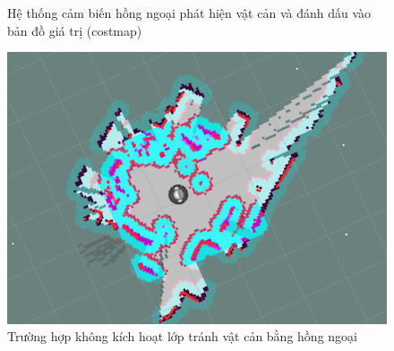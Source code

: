 \begin{figure}[htbp]
    \centering
    \hspace{8pt}
    \caption{Hệ thống cảm biến hồng ngoại phát hiện vật cản và đánh dấu vào bản đồ giá trị (costmap)}
    \label{fig:rb_withIR_ObstacleDetected}
\end{figure}

\begin{figure}[htbp]
    \centering
    \includegraphics[width=0.75\linewidth]{figures/RB_withoutIR_obstacleDetect.png}
    \caption{Trường hợp không kích hoạt lớp tránh vật cản bằng hồng ngoại}
    \label{fig:rb_withoutIR}
\end{figure}


